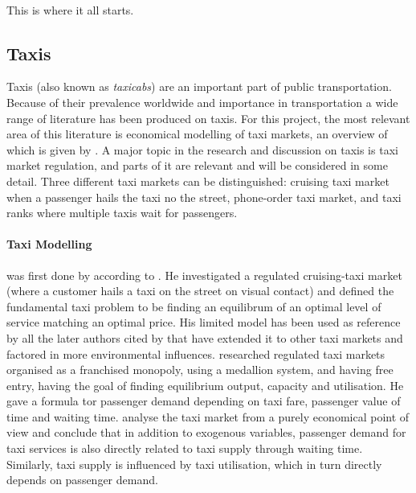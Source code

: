 \paragraph{}
This is where it all starts.

\subsection{Taxis}
Taxis (also known as \textit{taxicabs}) are an important part of public transportation. Because of their prevalence worldwide and importance in transportation a wide range of literature has been produced on taxis. For this project, the most relevant area of this literature is economical modelling of taxi markets, an overview of which is given by \textcite{Salanova2011taxi+review}. A major topic in the research and discussion on taxis is taxi market regulation, and parts of it are relevant and will be considered in some detail. Three different taxi markets can be distinguished: cruising taxi market when a passenger hails the taxi no the street, phone-order taxi market, and taxi ranks where multiple taxis wait for passengers.
\paragraph{Taxi Modelling} was first done by \textcite{Douglas1972taxi+regulation} according to \textcite{Salanova2011taxi+review}. He investigated a regulated cruising-taxi market (where a customer hails a taxi on the street on visual contact) and defined the fundamental taxi problem to be finding an equilibrum of an optimal level of service matching an optimal price. His limited model has been used as reference by all the later authors cited by \textcite{Salanova2011taxi+review} that have extended it to other taxi markets and factored in more environmental influences. \textcite{Devany1975taxi+capacity} researched regulated taxi markets organised as a franchised monopoly, using a medallion system, and having free entry, having the goal of finding equilibrium output, capacity and utilisation. He gave a formula tor passenger demand depending on taxi fare, passenger value of time and waiting time. \textcite{Manski1967taxi+demand} analyse the taxi market from a purely economical point of view and conclude that in addition to exogenous variables, passenger demand for taxi services is also directly related to taxi supply through waiting time. Similarly, taxi supply is influenced by taxi utilisation, which in turn directly depends on passenger demand.

